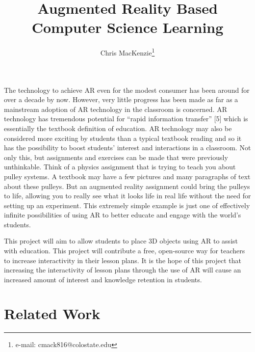 \documentclass{vgtc}                          %
\title{Augmented Reality Based Computer Science Learning}
\author{Chris MacKenzie\thanks{e-mail: cmack816@colostate.edu}}
\affiliation{\scriptsize CS464}
\begin{document}


\maketitle

The technology to achieve AR even for the modest consumer has been around for over a decade by now. However, very little progress has been made as far as a mainstream adoption of AR technology in the classroom is concerned. AR technology has tremendous potential for “rapid information transfer” [5] which is essentially the textbook definition of education. AR technology may also be considered more exciting by students than a typical textbook reading and so it has the possibility to boost students’ interest and interactions in a classroom. Not only this, but assignments and exercises can be made that were previously unthinkable. Think of a physics assignment that is trying to teach you about pulley systems. A textbook may have a few pictures and many paragraphs of text about these pulleys. But an augmented reality assignment could bring the pulleys to life, allowing you to really see what it looks life in real life without the need for setting up an experiment. This extremely simple example is just one of effectively infinite possibilities of using AR to better educate and engage with the world’s students. 

	This project will aim to allow students to place 3D objects using AR to assist with education. This project will contribute a free, open-source way for teachers to increase interactivity in their lesson plans. It is the hope of this project that increasing the interactivity of lesson plans through the use of AR will cause an increased amount of interest and knowledge retention in students.


\section{Related Work}
\end{document}
